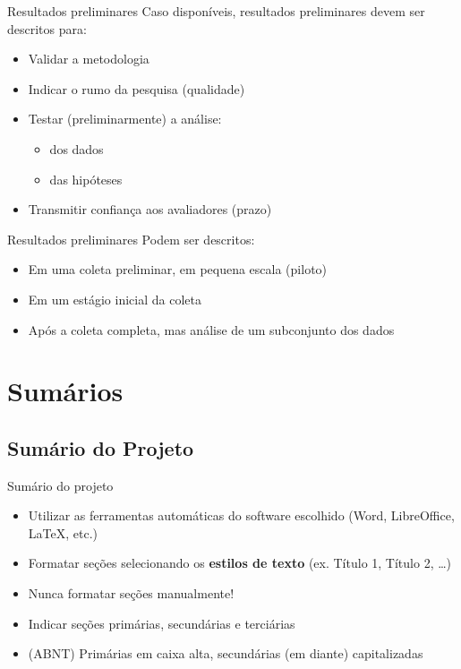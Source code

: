 \documentclass{beamer}
\begin{document}
\begin{frame}{Resultados preliminares}
  Caso disponíveis, resultados preliminares devem ser descritos para:
  \begin{itemize}
  \item Validar a metodologia
  \item Indicar o rumo da pesquisa (qualidade)
  \item Testar (preliminarmente) a análise:
    \begin{itemize}
    \item dos dados
    \item das hipóteses
    \end{itemize}
  \item Transmitir confiança aos avaliadores (prazo)
  \end{itemize}
\end{frame}

\begin{frame}{Resultados preliminares}
  Podem ser descritos:
  \begin{itemize}
  \item Em uma coleta preliminar, em pequena escala (piloto)
  \item Em um estágio inicial da coleta
  \item Após a coleta completa, mas análise de um subconjunto dos dados
  \end{itemize}
\end{frame}

\section{Sumários}

\subsection{Sumário do Projeto}

\begin{frame}{Sumário do projeto}
  \begin{itemize}
  \item Utilizar as ferramentas automáticas do software escolhido
    (Word, LibreOffice, \LaTeX, etc.)
  \item Formatar seções selecionando os {\bf estilos de texto}
    (ex. Título 1, Título 2, \ldots)
  \item \alert{Nunca} formatar seções manualmente!
  \item Indicar seções primárias, secundárias e terciárias
  \item (ABNT) Primárias em caixa alta, secundárias (em diante)
    capitalizadas
  \end{itemize}
\end{frame}
\end{document}
